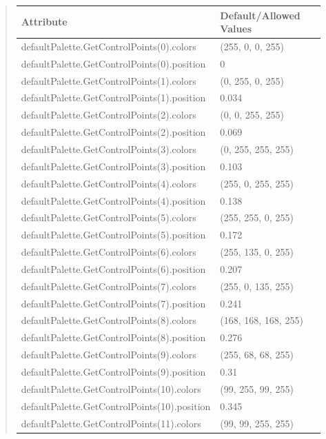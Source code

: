 \documentclass[letterpaper,10pt,english]{sphinxmanual}
\begin{document}
\begin{quote}
\begin{longtable}{|p{0.475\linewidth}|p{0.475\linewidth}|}
\textbf{Attribute}
 & 
\textbf{Default/Allowed Values}
\\
\hline
defaultPalette.GetControlPoints(0).colors
 & 
(255, 0, 0, 255)
\\
\hline
defaultPalette.GetControlPoints(0).position
 & 
0
\\
\hline
defaultPalette.GetControlPoints(1).colors
 & 
(0, 255, 0, 255)
\\
\hline
defaultPalette.GetControlPoints(1).position
 & 
0.034
\\
\hline
defaultPalette.GetControlPoints(2).colors
 & 
(0, 0, 255, 255)
\\
\hline
defaultPalette.GetControlPoints(2).position
 & 
0.069
\\
\hline
defaultPalette.GetControlPoints(3).colors
 & 
(0, 255, 255, 255)
\\
\hline
defaultPalette.GetControlPoints(3).position
 & 
0.103
\\
\hline
defaultPalette.GetControlPoints(4).colors
 & 
(255, 0, 255, 255)
\\
\hline
defaultPalette.GetControlPoints(4).position
 & 
0.138
\\
\hline
defaultPalette.GetControlPoints(5).colors
 & 
(255, 255, 0, 255)
\\
\hline
defaultPalette.GetControlPoints(5).position
 & 
0.172
\\
\hline
defaultPalette.GetControlPoints(6).colors
 & 
(255, 135, 0, 255)
\\
\hline
defaultPalette.GetControlPoints(6).position
 & 
0.207
\\
\hline
defaultPalette.GetControlPoints(7).colors
 & 
(255, 0, 135, 255)
\\
\hline
defaultPalette.GetControlPoints(7).position
 & 
0.241
\\
\hline
defaultPalette.GetControlPoints(8).colors
 & 
(168, 168, 168, 255)
\\
\hline
defaultPalette.GetControlPoints(8).position
 & 
0.276
\\
\hline
defaultPalette.GetControlPoints(9).colors
 & 
(255, 68, 68, 255)
\\
\hline
defaultPalette.GetControlPoints(9).position
 & 
0.31
\\
\hline
defaultPalette.GetControlPoints(10).colors
 & 
(99, 255, 99, 255)
\\
\hline
defaultPalette.GetControlPoints(10).position
 & 
0.345
\\
\hline
defaultPalette.GetControlPoints(11).colors
 & 
(99, 99, 255, 255)
\\

\end{longtable}
\end{quote}
\end{document}
